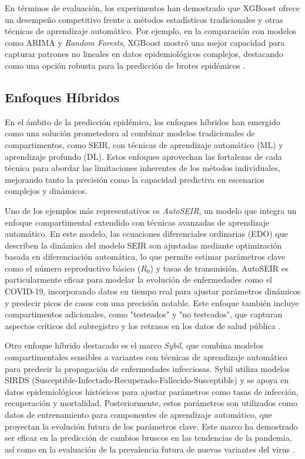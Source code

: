 En términos de evaluación, los experimentos han demostrado que XGBoost ofrece un desempeño competitivo frente a métodos estadísticos tradicionales y otras técnicas de aprendizaje automático. Por ejemplo, en la comparación con modelos como ARIMA y \textit{Random Forests}, XGBoost mostró una mejor capacidad para capturar patrones no lineales en datos epidemiológicos complejos, destacando como una opción robusta para la predicción de brotes epidémicos \cite{Nguyen2023, Baccega2024}.

\subsection{Enfoques Híbridos}\label{subsection:hybrid-approaches}

En el ámbito de la predicción epidémica, los enfoques híbridos han emergido como una solución prometedora al combinar modelos tradicionales de compartimentos, como SEIR, con técnicas de aprendizaje automático (ML) y aprendizaje profundo (DL). Estos enfoques aprovechan las fortalezas de cada técnica para abordar las limitaciones inherentes de los métodos individuales, mejorando tanto la precisión como la capacidad predictiva en escenarios complejos y dinámicos.

Uno de los ejemplos más representativos es \textit{AutoSEIR}, un modelo que integra un enfoque compartimental extendido con técnicas avanzadas de aprendizaje automático. En este modelo, las ecuaciones diferenciales ordinarias (EDO) que describen la dinámica del modelo SEIR son ajustadas mediante optimización basada en diferenciación automática, lo que permite estimar parámetros clave como el número reproductivo básico (\(R_0\)) y tasas de transmisión. AutoSEIR es particularmente eficaz para modelar la evolución de enfermedades como el COVID-19, incorporando datos en tiempo real para ajustar parámetros dinámicos y predecir picos de casos con una precisión notable. Este enfoque también incluye compartimentos adicionales, como "testeados" y "no testeados", que capturan aspectos críticos del subregistro y los retrasos en los datos de salud pública \cite{AutoSEIR2020}.

Otro enfoque híbrido destacado es el marco \textit{Sybil}, que combina modelos compartimentales sensibles a variantes con técnicas de aprendizaje automático para predecir la propagación de enfermedades infecciosas. Sybil utiliza modelos SIRDS (Susceptible-Infectado-Recuperado-Fallecido-Susceptible) y se apoya en datos epidemiológicos históricos para ajustar parámetros como tasas de infección, recuperación y mortalidad. Posteriormente, estos parámetros son utilizados como datos de entrenamiento para componentes de aprendizaje automático, que proyectan la evolución futura de los parámetros clave. Este marco ha demostrado ser eficaz en la predicción de cambios bruscos en las tendencias de la pandemia, así como en la evaluación de la prevalencia futura de nuevas variantes del virus \cite{Baccega2024}.

